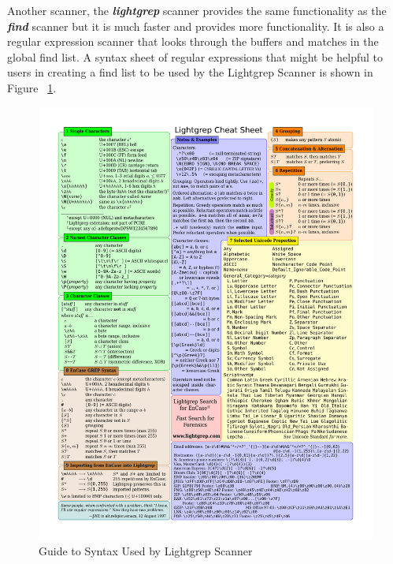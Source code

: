 \documentclass[11pt]{article} %
\begin{document}
Another scanner, the \textbf{\textit{lightgrep}} scanner provides the same functionality as the \textbf{\textit{find}} scanner but it is much faster and provides more functionality. It is also a regular expression scanner that looks through the buffers and matches in the global find list. A syntax sheet of regular expressions that might be helpful to users in creating a find list to be used by the Lightgrep Scanner is shown in Figure ~\ref{fig:lightgrepSyntax}. \\

\begin{figure}
	\includegraphics[scale=.80]{otherPics/LightgrepCheatSheet.pdf}
	\caption{Guide to Syntax Used by Lightgrep Scanner}
	\label{fig:lightgrepSyntax}
\end{figure}
\end{document}
